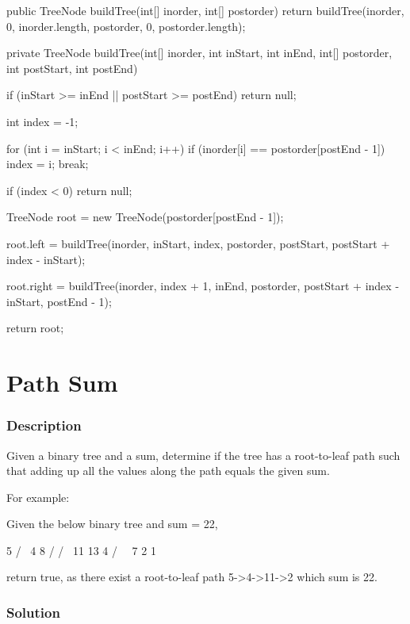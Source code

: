 \begin{Code}
public TreeNode buildTree(int[] inorder, int[] postorder) {
    return buildTree(inorder, 0, inorder.length, postorder, 0, postorder.length);
}

private TreeNode buildTree(int[] inorder, int inStart, int inEnd, int[] postorder,
    int postStart, int postEnd) {

    if (inStart >= inEnd || postStart >= postEnd) {
        return null;
    }

    int index = -1;

    for (int i = inStart; i < inEnd; i++) {
        if (inorder[i] == postorder[postEnd - 1]) {
            index = i;
            break;
        }
    }

    if (index < 0) {
        return null;
    }

    TreeNode root = new TreeNode(postorder[postEnd - 1]);

    root.left = buildTree(inorder, inStart, index, postorder,
        postStart, postStart + index - inStart);

    root.right = buildTree(inorder, index + 1, inEnd, postorder,
        postStart + index - inStart, postEnd - 1);

    return root;
}
\end{Code}

\newpage

\section{Path Sum} %

\subsubsection{Description}
Given a binary tree and a sum, determine if the tree has a root-to-leaf path such that adding up all the values along the path equals the given sum.

For example:

Given the below binary tree and sum = 22,
\begin{Code}
              5
             / \
            4   8
           /   / \
          11  13  4
         /  \      \
        7    2      1
\end{Code}

return true, as there exist a root-to-leaf path 5->4->11->2 which sum is 22.

\subsubsection{Solution}

